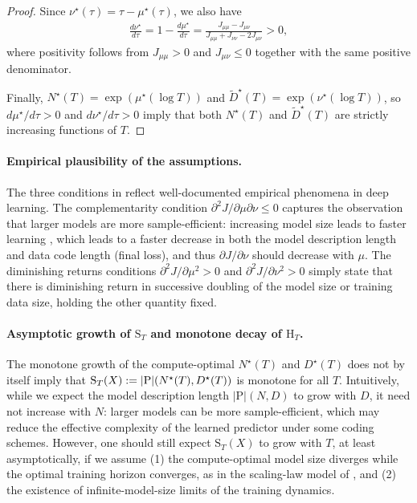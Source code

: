 \documentclass[twoside]{article}
\newcommand{\rH}{\mathrm{H}}
\newcommand{\rS}{\mathrm{S}}
\begin{document}
\begin{proof}
Since $\nu^\star(\tau) = \tau - \mu^\star(\tau)$, we also have
\begin{align}
    \frac{d\nu^\star}{d\tau}
    = 1 - \frac{d\mu^\star}{d\tau}
    = \frac{J_{\mu\mu} - J_{\mu\nu}}{J_{\mu\mu} + J_{\nu\nu} - 2J_{\mu\nu}}
    > 0,
    \label{eq:dnu-dtau-clean}
\end{align}
where positivity follows from $J_{\mu\mu} > 0$ and $J_{\mu\nu} \le 0$ together with the same positive denominator.

Finally, $N^\star(T) = \exp(\mu^\star(\log T))$ and $\widetilde{D}^\star(T) = \exp(\nu^\star(\log T))$, so $d\mu^\star/d\tau > 0$ and $d\nu^\star/d\tau > 0$ imply that both $N^\star(T)$ and $\widetilde{D}^\star(T)$ are strictly increasing functions of $T$.
\end{proof}

\paragraph{Empirical plausibility of the assumptions.}
The three conditions in  reflect well-documented empirical phenomena in deep learning. The complementarity condition $\partial^2 J / \partial \mu \partial \nu \le 0$ captures the observation that larger models are more sample-efficient: increasing model size leads to faster learning \citep{kaplan2020scaling,yang2022tensor}, which leads to a faster decrease in both the model description length and data code length (final loss), and thus $\partial J / \partial\nu$ should decrease with $\mu$. The diminishing returns conditions $\partial^2 J / \partial \mu^2 > 0$ and $\partial^2 J / \partial \nu^2 > 0$ simply state that there is diminishing return in successive doubling of the model size or training data size, holding the other quantity fixed.


\paragraph{Asymptotic growth of $\rS_T$ and monotone decay of $\rH_T$.}
The monotone growth of the compute-optimal $N^\star(T)$ and $D^\star(T)$ does not by itself imply that $\rS_T(X) := |\mathrm{P}|\qty(N^\star(T), D^\star(T))$ is monotone for all $T$. Intuitively, while we expect the model description length $|\mathrm{P}|(N, D)$ to grow with $D$, it need not increase with $N$: larger models can be more sample-efficient, which may reduce the effective complexity of the learned predictor under some coding schemes. However, one should still expect $\rS_T(X)$ to grow with $T$, at least asymptotically, if we assume (1) the compute-optimal model size diverges while the optimal training horizon converges, as in the scaling-law model of , and (2) the existence of infinite-model-size limits of the training dynamics.
\end{document}
